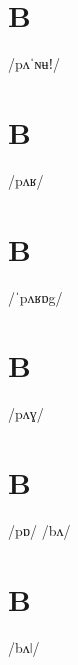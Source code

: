 \documentclass[10pt,a4paper,twoside]{book}
\begin{document}
\section*{B}

\begin{multicols}{3}
 {/pʌˈɴʉǃ/} {}
\end{multicols}

\section*{B}

\begin{multicols}{3}
 {/pʌʁ/} {}
\end{multicols}

\section*{B}

\begin{multicols}{3}
 {/ˈpʌʁɒg/} {}
\end{multicols}

\section*{B}

\begin{multicols}{3}
 {/pʌɣ/} {}
\end{multicols}

\section*{B}

\begin{multicols}{3}
 {/pɒ/} {}
 {/bʌ/} {}
\end{multicols}

\section*{B}

\begin{multicols}{3}
 {/bʌǀ/} {}
\end{multicols}
\end{document}
